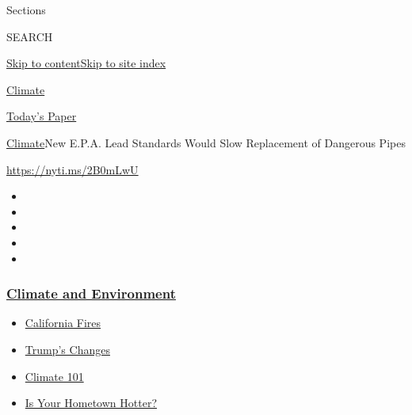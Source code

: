 Sections

SEARCH

\protect\hyperlink{site-content}{Skip to
content}\protect\hyperlink{site-index}{Skip to site index}

\href{https://www.nytimes3xbfgragh.onion/section/climate}{Climate}

\href{https://myaccount.nytimes3xbfgragh.onion/auth/login?response_type=cookie\&client_id=vi}{}

\href{https://www.nytimes3xbfgragh.onion/section/todayspaper}{Today's
Paper}

\href{/section/climate}{Climate}\textbar{}New E.P.A. Lead Standards
Would Slow Replacement of Dangerous Pipes

\url{https://nyti.ms/2B0mLwU}

\begin{itemize}
\item
\item
\item
\item
\item
\end{itemize}

\hypertarget{climate-and-environment}{%
\subsubsection{\texorpdfstring{\href{https://www.nytimes3xbfgragh.onion/section/climate?name=styln-climate\&region=TOP_BANNER\&block=storyline_menu_recirc\&action=click\&pgtype=Article\&impression_id=63ffa950-f2a0-11ea-b7f7-11b03ec68d1d\&variant=undefined}{Climate
and
Environment}}{Climate and Environment}}\label{climate-and-environment}}

\begin{itemize}
\tightlist
\item
  \href{https://www.nytimes3xbfgragh.onion/article/why-does-california-have-wildfires.html?name=styln-climate\&region=TOP_BANNER\&block=storyline_menu_recirc\&action=click\&pgtype=Article\&impression_id=63ffa951-f2a0-11ea-b7f7-11b03ec68d1d\&variant=undefined}{California
  Fires}
\item
  \href{https://www.nytimes3xbfgragh.onion/interactive/2020/climate/trump-environment-rollbacks.html?name=styln-climate\&region=TOP_BANNER\&block=storyline_menu_recirc\&action=click\&pgtype=Article\&impression_id=63ffd060-f2a0-11ea-b7f7-11b03ec68d1d\&variant=undefined}{Trump's
  Changes}
\item
  \href{https://www.nytimes3xbfgragh.onion/interactive/2020/04/19/climate/climate-crash-course-1.html?name=styln-climate\&region=TOP_BANNER\&block=storyline_menu_recirc\&action=click\&pgtype=Article\&impression_id=63ffd061-f2a0-11ea-b7f7-11b03ec68d1d\&variant=undefined}{Climate
  101}
\item
  \href{https://www.nytimes3xbfgragh.onion/interactive/2018/08/30/climate/how-much-hotter-is-your-hometown.html?name=styln-climate\&region=TOP_BANNER\&block=storyline_menu_recirc\&action=click\&pgtype=Article\&impression_id=63ffd062-f2a0-11ea-b7f7-11b03ec68d1d\&variant=undefined}{Is
  Your Hometown Hotter?}
\end{itemize}

